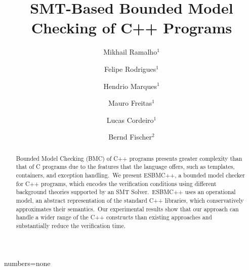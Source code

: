\documentclass[a4paper]{llncs}
\begin{document}
{numbers=none}
\lstset{language=C,basicstyle=\small}
\lstset{numbers=left, numberstyle=\tiny, stepnumber=1, numbersep=5pt}
\lstset{tabsize=2}
\lstset{firstnumber=1}
\lstset{frame=single}


\title{SMT-Based Bounded Model Checking of C++ Programs}
\author{Mikhail Ramalho$^1$ 	\and
	Felipe Rodrigues$^1$   	\and
	Hendrio Marques$^1$   	\and
	Mauro Freitas$^1$   	\and
	Lucas Cordeiro$^1$   	\and
	Bernd Fischer$^2$}

\maketitle

\begin{abstract}
Bounded Model Checking (BMC) of C++ programs presents greater
complexity than that of C programs due to the features that the language offers, such as
templates, containers, and exception handling.\ We present ESBMC++, a bounded
model checker for C++ programs, which encodes the verification conditions
using different background theories supported
by an SMT Solver.\ ESBMC++ uses an operational model,
an abstract representation of
the standard C++ libraries, which conservatively approximates their semantics.\ Our
experimental results show that our approach can handle a wider range of the C++
constructs than existing approaches and substantially reduce the verification time.
\end{abstract}
%
\end{document}
